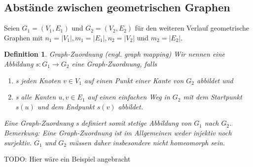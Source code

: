 \documentclass[a4paper, 12pt, twoside]{article}
\theoremstyle{Format1} %
\newtheorem{Def}{Definition}[section]       %
\begin{document}
\subsection{Abstände zwischen geometrischen Graphen}

Seien $ G_1=(V_1, E_1) $ und $ G_2=(V_2, E_2) $ für den weiteren Verlauf geometrische Graphen mit
$n_1 = |V_1|, m_1 = |E_1|, n_2 = |V_2|$ und $m_2 = |E_2|$.
\begin{Def}
	Graph-Zuordnung (engl. graph mapping)
	Wir nennen eine Abbildung $s: G_1 \to G_2 $ eine \textit{Graph-Zuordnung}, falls
    	\begin{enumerate}
		\item[1)] s jeden Knoten $ v \in V_1 $ auf einen Punkt einer Kante von $ G_2 $ abbildet und
		\item[2)] s alle Kanten $ {u,v} \in E_1 $ auf einen einfachen Weg in $G_2$ mit dem Startpunkt $s(u)$ und dem Endpunkt $s(v)$ abbildet.
    	\end{enumerate}

	Eine Graph-Zuordnung s definiert somit stetige Abbildung von $ G_1 $ nach $ G_2 $.\\
	Bemerkung: Eine Graph-Zuordnung ist im Allgemeinen weder injektiv noch surjektiv.
	$ G_1 $ und $ G_2 $ müssen daher insbesondere nicht homeomorph sein.

\end{Def}

TODO: Hier wäre ein Beispiel angebracht
\end{document}
